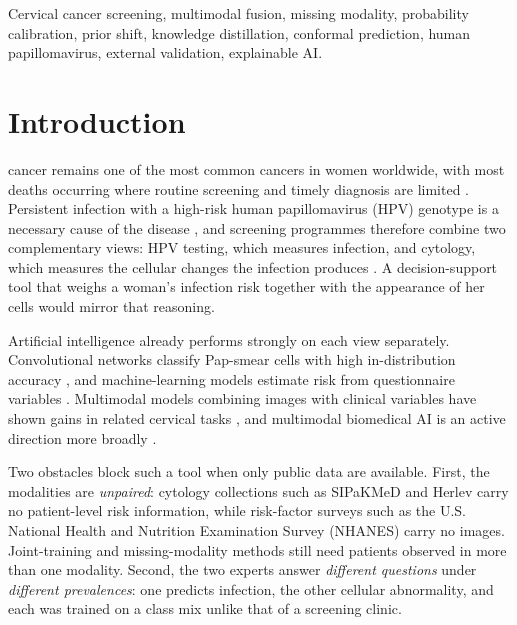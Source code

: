 \documentclass[lettersize,journal]{IEEEtran}
\begin{document}
\begin{IEEEkeywords}
Cervical cancer screening, multimodal fusion, missing modality, probability calibration, prior shift, knowledge distillation, conformal prediction, human papillomavirus, external validation, explainable AI.
\end{IEEEkeywords}

\section{Introduction}
 cancer remains one of the most common cancers in women worldwide, with most deaths occurring where routine screening and timely diagnosis are limited \cite{WHO_cervical_cancer}. Persistent infection with a high-risk human papillomavirus (HPV) genotype is a necessary cause of the disease \cite{walboomers1999hpv}, and screening programmes therefore combine two complementary views: HPV testing, which measures infection, and cytology, which measures the cellular changes the infection produces \cite{WHO_screening_guideline}. A decision-support tool that weighs a woman's infection risk together with the appearance of her cells would mirror that reasoning.

Artificial intelligence already performs strongly on each view separately. Convolutional networks classify Pap-smear cells with high in-distribution accuracy \cite{zhang2017deeppap,tan2024cervical,youneszade2023deep}, and machine-learning models estimate risk from questionnaire variables \cite{fernandes2017cervical,sun2022stacking,chadaga2022predicting}. Multimodal models combining images with clinical variables have shown gains in related cervical tasks \cite{das2026topoticerv,wang2025cervipro,sha2024cervifusionnet}, and multimodal biomedical AI is an active direction more broadly \cite{acosta2022multimodal,baltrusaitis2019multimodal}.

Two obstacles block such a tool when only public data are available. First, the modalities are \emph{unpaired}: cytology collections such as SIPaKMeD \cite{plissiti2018sipakmed} and Herlev \cite{jantzen2005herlev} carry no patient-level risk information, while risk-factor surveys such as the U.S. National Health and Nutrition Examination Survey (NHANES) \cite{nhanes} carry no images. Joint-training and missing-modality methods \cite{havaei2016hemis,yao2024drfuse,wu2026deep} still need patients observed in more than one modality. Second, the two experts answer \emph{different questions} under \emph{different prevalences}: one predicts infection, the other cellular abnormality, and each was trained on a class mix unlike that of a screening clinic.
\end{document}
